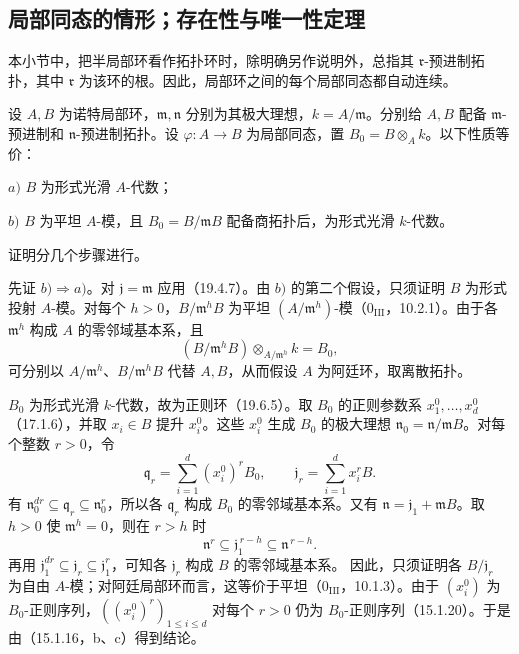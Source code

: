 \subsection{局部同态的情形；存在性与唯一性定理}
本小节中，把半局部环看作拓扑环时，除明确另作说明外，总指其 $\mathfrak r$-预进制拓扑，其中 $\mathfrak r$ 为该环的根。因此，局部环之间的每个局部同态都自动连续。

设 $A,B$ 为诺特局部环，$\mathfrak m,\mathfrak n$ 分别为其极大理想，$k=A/\mathfrak m$。分别给 $A,B$ 配备 $\mathfrak m$-预进制和 $\mathfrak n$-预进制拓扑。设 $\varphi:A\to B$ 为局部同态，置 $B_0=B\otimes_Ak$。以下性质等价：

$a)$ $B$ 为形式光滑 $A$-代数；

$b)$ $B$ 为平坦 $A$-模，且 $B_0=B/\mathfrak mB$ 配备商拓扑后，为形式光滑 $k$-代数。

证明分几个步骤进行。

先证 $b)\Rightarrow a)$。对 $\mathfrak j=\mathfrak m$ 应用（19.4.7）。由 $b)$ 的第二个假设，只须证明 $B$ 为形式投射 $A$-模。对每个 $h>0$，$B/\mathfrak m^hB$ 为平坦 $(A/\mathfrak m^h)$-模（$0_{\mathrm{III}}$，10.2.1）。由于各 $\mathfrak m^h$ 构成 $A$ 的零邻域基本系，且
\[
 (B/\mathfrak m^hB)\otimes_{A/\mathfrak m^h}k=B_0,
\]
可分别以 $A/\mathfrak m^h$、$B/\mathfrak m^hB$ 代替 $A,B$，从而假设 $A$ 为阿廷环，取离散拓扑。

$B_0$ 为形式光滑 $k$-代数，故为正则环（19.6.5）。取 $B_0$ 的正则参数系 $x_1^0,\ldots,x_d^0$（17.1.6），并取 $x_i\in B$ 提升 $x_i^0$。这些 $x_i^0$ 生成 $B_0$ 的极大理想 $\mathfrak n_0=\mathfrak n/\mathfrak mB$。对每个整数 $r>0$，令
\[
 \mathfrak q_r=\sum_{i=1}^{d}(x_i^0)^rB_0,
 \qquad \mathfrak j_r=\sum_{i=1}^{d}x_i^rB.
\]
有 $\mathfrak n_0^{dr}\subseteq\mathfrak q_r\subseteq\mathfrak n_0^r$，所以各 $\mathfrak q_r$ 构成 $B_0$ 的零邻域基本系。又有 $\mathfrak n=\mathfrak j_1+\mathfrak mB$。取 $h>0$ 使 $\mathfrak m^h=0$，则在 $r>h$ 时
\[
 \mathfrak n^r\subseteq\mathfrak j_1^{\,r-h}\subseteq\mathfrak n^{\,r-h}.
\]
再用 $\mathfrak j_1^{dr}\subseteq\mathfrak j_r\subseteq\mathfrak j_1^r$，可知各 $\mathfrak j_r$ 构成 $B$ 的零邻域基本系。
因此，只须证明各 $B/\mathfrak j_r$ 为自由 $A$-模；对阿廷局部环而言，这等价于平坦（$0_{\mathrm{III}}$，10.1.3）。由于 $(x_i^0)$ 为 $B_0$-正则序列，$( (x_i^0)^r )_{1\le i\le d}$ 对每个 $r>0$ 仍为 $B_0$-正则序列（15.1.20）。于是由（15.1.16，b、c）得到结论。

